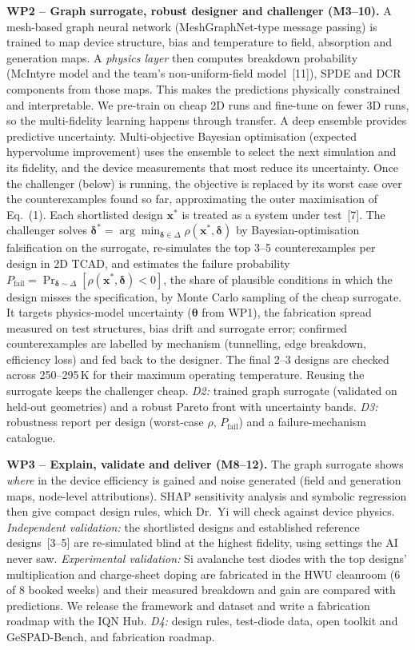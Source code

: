 \documentclass[11pt,a4paper]{article}
\newcommand{\cn}[1]{\textcolor{citeblue}{[#1]}}
\begin{document}
\textbf{WP2 -- Graph surrogate, robust designer and challenger (M3--10).} A mesh-based graph neural network (MeshGraphNet-type message passing) is trained to map device structure, bias and temperature to field, absorption and generation maps. A \emph{physics layer} then computes breakdown probability (McIntyre model and the team's non-uniform-field model~\cn{11}), SPDE and DCR components from those maps. This makes the predictions physically constrained and interpretable. We pre-train on cheap 2D runs and fine-tune on fewer 3D runs, so the multi-fidelity learning happens through transfer. A deep ensemble provides predictive uncertainty. Multi-objective Bayesian optimisation (expected hypervolume improvement) uses the ensemble to select the next simulation and its fidelity, and the device measurements that most reduce its uncertainty. Once the challenger (below) is running, the objective is replaced by its worst case over the counterexamples found so far, approximating the outer maximisation of Eq.~(1).
Each shortlisted design $\mathbf{x}^*$ is treated as a system under test~\cn{7}. The challenger solves $\boldsymbol{\delta}^*=\arg\min_{\boldsymbol{\delta}\in\Delta}\rho(\mathbf{x}^*,\boldsymbol{\delta})$ by Bayesian-optimisation falsification on the surrogate, re-simulates the top 3--5 counterexamples per design in 2D TCAD, and estimates the failure probability $P_\mathrm{fail}=\Pr_{\boldsymbol{\delta}\sim\Delta}[\rho(\mathbf{x}^*,\boldsymbol{\delta})<0]$, the share of plausible conditions in which the design misses the specification, by Monte Carlo sampling of the cheap surrogate. It targets physics-model uncertainty ($\boldsymbol{\theta}$ from WP1), the fabrication spread measured on test structures, bias drift and surrogate error; confirmed counterexamples are labelled by mechanism (tunnelling, edge breakdown, efficiency loss) and fed back to the designer. The final 2--3 designs are checked across 250--295\,K for their maximum operating temperature. Reusing the surrogate keeps the challenger cheap.
\emph{D2:} trained graph surrogate (validated on held-out geometries) and a robust Pareto front with uncertainty bands. \emph{D3:} robustness report per design (worst-case $\rho$, $P_\mathrm{fail}$) and a failure-mechanism catalogue.

\textbf{WP3 -- Explain, validate and deliver (M8--12).} The graph surrogate shows \emph{where} in the device efficiency is gained and noise generated (field and generation maps, node-level attributions). SHAP sensitivity analysis and symbolic regression then give compact design rules, which Dr.~Yi will check against device physics. \emph{Independent validation:} the shortlisted designs and established reference designs~\cn{3--5} are re-simulated blind at the highest fidelity, using settings the AI never saw. \emph{Experimental validation:} Si avalanche test diodes with the top designs' multiplication and charge-sheet doping are fabricated in the HWU cleanroom (6 of 8 booked weeks) and their measured breakdown and gain are compared with predictions. We release the framework and dataset and write a fabrication roadmap with the IQN Hub.
\emph{D4:} design rules, test-diode data, open toolkit and GeSPAD-Bench, and fabrication roadmap.
\end{document}
